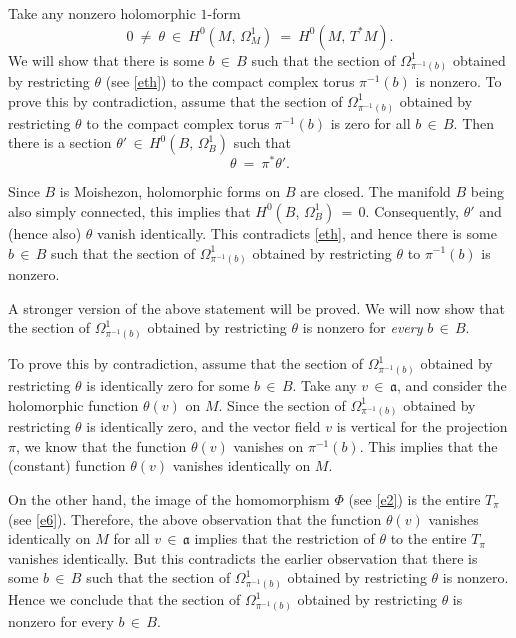 \documentclass[12pt,reqno]{amsart}
\theoremstyle{definition}
\numberwithin{equation}{section}
\begin{document}
Take any nonzero holomorphic $1$-form
\begin{equation}\label{eth}
0\ \not=\ \theta\ \in\ H^0(M,\, \Omega^1_M)\ =\ H^0(M,\, T^*M).
\end{equation}
We will show that there is some $b\, \in\, B$ such that the section of $\Omega^1_{\pi^{-1}(b)}$ obtained by 
restricting $\theta$ (see \eqref{eth}) to the compact complex torus $\pi^{-1}(b)$ is nonzero. To prove this 
by contradiction, assume that the section of $\Omega^1_{\pi^{-1}(b)}$ obtained by restricting $\theta$ to 
the compact complex torus $ \pi^{-1}(b)$ is zero for all $b\, \in\, B$. Then there is a section $\theta'\, 
\in\, H^0(B,\, \Omega^1_B)$ such that $$\theta\ =\ \pi^*\theta'.$$

Since $B$ is Moishezon, holomorphic forms on $B$ are closed. The manifold $B$ being also simply connected, 
this implies that $H^0(B,\, \Omega^1_B)\,=\,0$. Consequently, $\theta'$ and (hence also) $\theta$ vanish 
identically. This contradicts \eqref{eth}, and hence there is some $b\, \in\, B$ such that the section of
$\Omega^1_{\pi^{-1}(b)}$ obtained by restricting $\theta$ to $\pi^{-1}(b)$ is nonzero.

A stronger version of the above statement will be proved. We will now show that the 
section of $\Omega^1_{\pi^{-1}(b)}$ obtained by restricting $\theta$ is nonzero for
\textit{every} $b\, \in\, B$.

To prove this by contradiction, assume that the section of $\Omega^1_{\pi^{-1}(b)}$ obtained by restricting 
$\theta$ is identically zero for some $b\, \in\, B$. Take any $v\, \in\, {\mathfrak a}$, and consider the 
holomorphic function $\theta (v)$ on $M$. Since the section of $\Omega^1_{\pi^{-1}(b)}$ obtained by 
restricting $\theta$ is identically zero, and the vector field $v$ is vertical for the projection $\pi$, we 
know that the function $\theta (v)$ vanishes on $\pi^{-1}(b)$. This implies that the (constant) function 
$\theta (v)$ vanishes identically on $M$.

On the other hand, the image of the homomorphism $\Phi$ (see \eqref{e2}) is the entire $T_\pi$ (see 
\eqref{e6}). Therefore, the above observation that the function $\theta (v)$ vanishes identically on $M$ 
for all $v\, \in\, {\mathfrak a}$ implies that the restriction of $\theta$ to the entire $T_\pi$ vanishes 
identically. But this contradicts the earlier observation that there is some $b\, \in\, B$ such that the 
section of $\Omega^1_{\pi^{-1}(b)}$ obtained by restricting $\theta$ is nonzero. Hence we conclude that the 
section of $\Omega^1_{\pi^{-1}(b)}$ obtained by restricting $\theta$ is nonzero for every $b\, \in\, B$.
\end{document}
